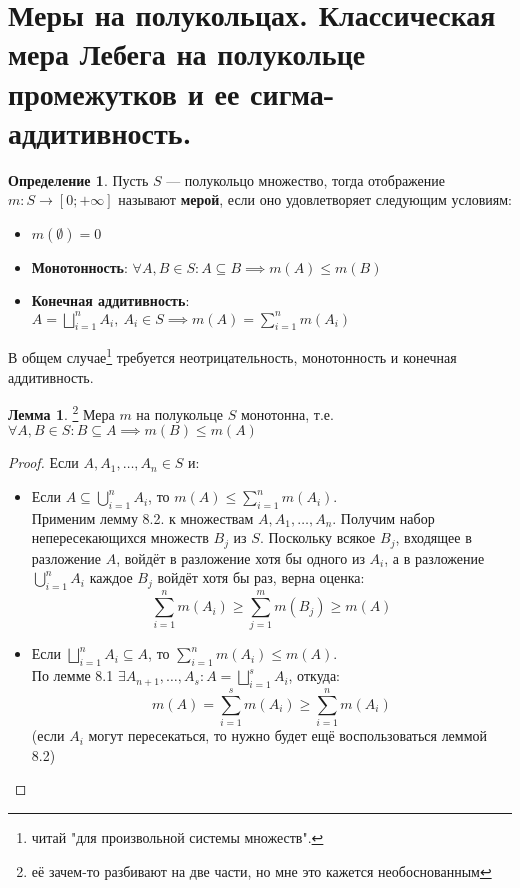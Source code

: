 \documentclass[11pt,a4paper]{report}
\theoremstyle{definition}
\theoremstyle{definition}
\newtheorem{lemma}{Лемма}[section]
\theoremstyle{definition}
\newtheorem{definition}{Определение}[section]
\begin{document}
	\section{Меры на полукольцах. Классическая мера Лебега на полукольце промежутков и ее сигма-аддитивность.}
	\begin{definition}
	Пусть $ S $ — полукольцо множество, тогда отображение $ m: S \to [0; +\infty]$ называют \textbf{мерой}, если оно удовлетворяет следующим условиям:
	\begin{itemize}
		\item $ m(\emptyset) = 0 $
		\item \textbf{Монотонность}: $ \forall A, B \in S: A \subseteq B \implies m(A) \le m(B) $
		\item \textbf{Конечная аддитивность}: $ A = \bigsqcup\limits_{i=1}^{n} A_{i},\ A_{i} \in S \implies m(A) = \sum\limits_{i=1}^{n} m(A_{i}) $
	\end{itemize}
	В общем случае\footnote{читай "для произвольной системы множеств".} требуется неотрицательность, монотонность и конечная аддитивность.
	\end{definition}
	\begin{lemma}\footnote{её зачем-то разбивают на две части, но мне это кажется необоснованным}
		Мера $ m $ на полукольце $ S $ монотонна, т.е. $ \forall A, B \in S: B \subseteq A \implies m(B) \le m(A) $
	\end{lemma}
	\begin{proof}
		Если $ A, A_{1}, \dots, A_{n} \in S $ и:
		\begin{itemize}
			\item Если $ A \subseteq \bigcup_{i=1}^{n}{A_{i}} $, то $ m(A) \le \sum_{i=1}^{n}{m(A_{i})} $.\\ 
			Применим лемму 8.2. к множествам $ A, A_{1}, \dots, A_{n} $. Получим набор непересекающихся множеств $ B_{j} $ из $ S $. Поскольку всякое $ B_{j} $, входящее в разложение $ A $, войдёт в разложение хотя бы одного из $ A_{i} $, а в разложение $ \bigcup_{i=1}^{n} A_{i} $ каждое $ B_{j} $ войдёт хотя бы раз, верна оценка:
				 \[ \sum_{i=1}^{n}{m(A_{i})} \ge \sum_{j=1}^{m}{m(B_{j})}  \ge m(A) \]
			\item Если $ \bigsqcup_{i=1}^{n}{A_{i}} \subseteq A $, то $ \sum_{i=1}^{n}{m(A_{i})} \le m(A) $.\\ По лемме 8.1 $ \exists A_{n+1}, \dots, A_{s}: A = \bigsqcup_{i=1}^{s} A_{i} $, откуда: 
			\[
				m(A) = \sum\limits_{i=1}^{s} m(A_{i}) \ge \sum\limits_{i=1}^{n} m(A_{i})
			\]
			(если $ A_{i} $ могут пересекаться, то нужно будет ещё воспользоваться леммой 8.2)
		\end{itemize}
	\end{proof}
\end{document}

